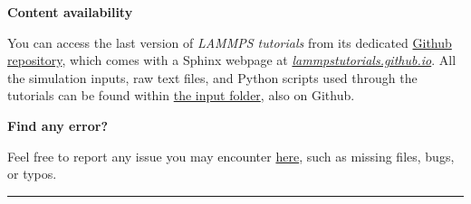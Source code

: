 \thispagestyle{empty}
\setcounter{page}{0}



\vspace{1.5cm}


\noindent \textbf{\large Content availability}

\vspace{0.5cm}

\noindent You can access the last version of \emph{LAMMPS tutorials} from its dedicated \href{https://github.com/lammpstutorials/lammpstutorials.github.io}{Github repository}, which comes with a Sphinx webpage at \href{https://lammpstutorials.github.io/}{\emph{lammpstutorials.github.io}}. All the simulation inputs, raw text files, and Python scripts used through the tutorials can be found within \href{https://github.com/lammpstutorials/lammpstutorials.github.io/tree/version2.0/docs/inputs}{the input folder}, also on Github.

\vspace{0.5cm}

\noindent \textbf{\large Find any error?}

\vspace{0.5cm}

\noindent Feel free to report any issue you may encounter \href{https://github.com/lammpstutorials/lammpstutorials.github.io/issues}{here}, such as missing files, bugs, or typos.

\vspace*{\fill}

\par\noindent\rule{\textwidth}{0.5pt}

\doclicenseThis

